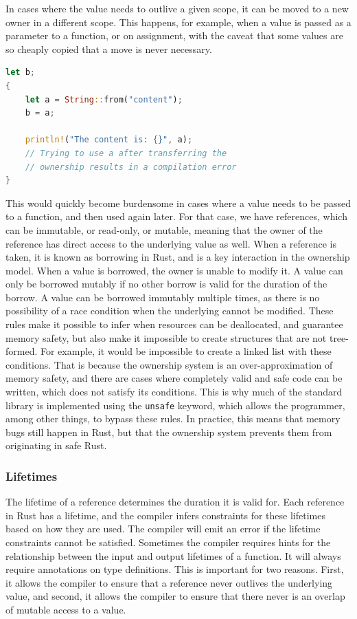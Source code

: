 \documentclass{article}
\begin{document}
In cases where the value needs to outlive a given scope, it can be moved to a new owner in a different scope. This happens, for example, when a value is passed as a parameter to a function, or on assignment, with the caveat that some values are so cheaply copied that a move is never necessary.

\begin{lstlisting}[language=Rust, style=boxed, caption=Transferring Ownership, label=lst:transfer-ownership]
let b;
{
    let a = String::from("content"); 
    b = a;

    println!("The content is: {}", a); 
    // Trying to use a after transferring the
    // ownership results in a compilation error
}
\end{lstlisting}

This would quickly become burdensome in cases where a value needs to be passed to a function, and then used again later. For that case, we have references, which can be immutable, or read-only, or mutable, meaning that the owner of the reference has direct access to the underlying value as well. When a reference is taken, it is known as borrowing in Rust, and is a key interaction in the ownership model. When a value is borrowed, the owner is unable to modify it. A value can only be borrowed mutably if no other borrow is valid for the duration of the borrow. A value can be borrowed immutably multiple times, as there is no possibility of a race condition when the underlying cannot be modified. These rules make it possible to infer when resources can be deallocated, and guarantee memory safety, but also make it impossible to create structures that are not tree-formed. For example, it would be impossible to create a linked list with these conditions. That is because the ownership system is an over-approximation of memory safety, and there are cases where completely valid and safe code can be written, which does not satisfy its conditions. This is why much of the standard library is implemented using the \lstinline{unsafe} keyword, which allows the programmer, among other things, to bypass these rules.
In practice, this means that memory bugs still happen in Rust, but that the ownership system prevents them from originating in safe Rust.

\subsubsection{Lifetimes}
The lifetime of a reference determines the duration it is valid for. Each reference in Rust has a lifetime, and the compiler infers constraints for these lifetimes based on how they are used. The compiler will emit an error if the lifetime constraints cannot be satisfied. Sometimes the compiler requires hints for the relationship between the input and output lifetimes of a function. It will always require annotations on type definitions. This is important for two reasons. First, it allows the compiler to ensure that a reference never outlives the underlying value, and second, it allows the compiler to ensure that there never is an overlap of mutable access to a value.
\end{document}
